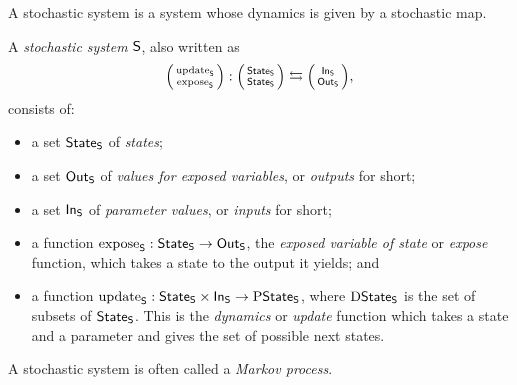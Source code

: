 \documentclass[DynamicalBook]{subfiles}
\begin{document}
A stochastic system is a system whose dynamics is given by a stochastic map. 
\begin{definition}\label{def.stochastic_system}
  A \emph{stochastic system} $\mathsf{S}$, also written as 
  $$\lens{\update{S}}{\expose{S}} : \lens{\State{S}}{\State{S}} \leftrightarrows \lens{\In{S}}{\Out{S}},$$ 
  consists of:
  \begin{itemize}
    \item a set $\mathsf{State}_{\mathsf{S}}$ of \emph{states};
    \item a set $\mathsf{Out}_{\mathsf{S}}$ of \emph{values for exposed variables}, or \emph{outputs}
      for short;
    \item a set $\mathsf{In}_{\mathsf{S}}$ of \emph{parameter values}, or \emph{inputs} for short;
    \item a function $\mathrm{expose}_{\mathsf{S}} : \mathsf{State}_{\mathsf{S}} \to \mathsf{Out}_{\mathsf{S}}$, the \emph{exposed variable of state} or
      \emph{expose} function, which takes a state to the output it yields; and
    \item a function $\mathrm{update}_{\mathsf{S}} : \mathsf{State}_{\mathsf{S}} \times \mathsf{In}_{\mathsf{S}} \to
      \mathrm{P}\mathsf{State}_{\mathsf{S}}$, where $\mathrm{D}\mathsf{State}_{\mathsf{S}}$ is the set of subsets of
      $\mathsf{State}_{\mathsf{S}}$. This is the \emph{dynamics} or
      \emph{update} function which takes a state and a parameter and gives the
      set of possible next states.
  \end{itemize}
\end{definition}

\begin{remark}
 A stochastic system is often called a \emph{Markov process}. 
\end{remark}
\end{document}
